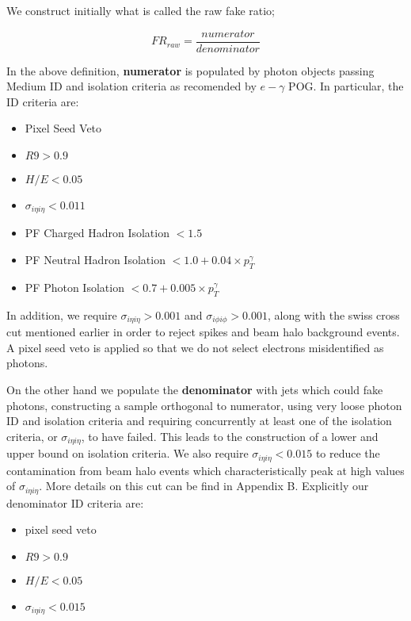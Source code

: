 We construct initially what is called the raw fake ratio; 

\begin{equation}FR_{raw}=\frac{numerator}{denominator}\end{equation}

In the above definition, \textbf{numerator} is populated by photon objects passing Medium ID and isolation criteria as recomended by $e-\gamma$ POG. In particular, the ID criteria are:

\begin{itemize}
\item Pixel Seed Veto
\item $R9>0.9$
\item $H/E<0.05$
\item $\sigma_{i\eta i\eta} < 0.011$
\item PF Charged Hadron Isolation $ < 1.5$
\item PF Neutral Hadron Isolation $ < 1.0+0.04\times p_{T}^{\gamma}$
\item PF Photon Isolation $ < 0.7+0.005\times p_{T}^{\gamma}$
\end{itemize}

In addition, we require $\sigma_{i\eta i\eta} > 0.001$ and $\sigma_{i\phi i\phi} > 0.001$, along with the swiss cross cut mentioned earlier in order to reject spikes and beam halo background events. 
A pixel seed veto is applied so that we do not select electrons misidentified as photons.

On the other hand we populate the \textbf{denominator} with jets which could fake photons, constructing a sample orthogonal to numerator, using very loose photon ID and isolation criteria and requiring concurrently at least one of the isolation criteria, or $\sigma_{i\eta i\eta}$, to have failed. 
This leads to the construction of a lower and upper bound on isolation criteria. 
We also require $\sigma_{i\eta i\eta} < 0.015$ to reduce the contamination from beam halo events which characteristically peak at high values of $\sigma_{i\eta i\eta}$. 
More details on this cut can be find in Appendix B. Explicitly our denominator ID criteria are:

\begin{itemize}
\item pixel seed veto
\item $R9>0.9$
\item $H/E<0.05$
\item $\sigma_{i\eta i\eta}<0.015$
\end{itemize}

